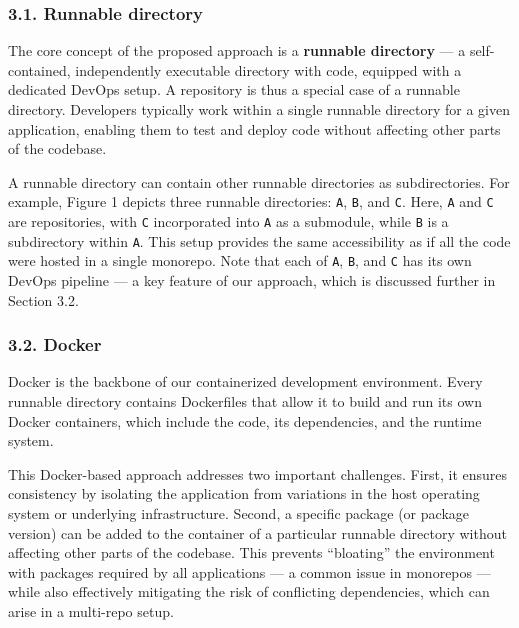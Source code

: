 \documentclass{article}
\begin{document}
\subsubsection{3.1. Runnable directory}
\label{runnable-directory}

The core concept of the proposed approach is a \textbf{runnable directory} --- a
self-contained, independently executable directory with code, equipped with a
dedicated DevOps setup. A repository is thus a special case of a runnable directory.
Developers typically work within a single runnable directory for a given
application, enabling them to test and deploy code without affecting other parts
of the codebase.

A runnable directory can contain other runnable directories as subdirectories.
For example, Figure 1 depicts three runnable directories: \texttt{A}, \texttt{B},
and \texttt{C}. Here, \texttt{A} and \texttt{C} are repositories, with \texttt{C}
incorporated into \texttt{A} as a submodule, while \texttt{B} is a subdirectory
within \texttt{A}. This setup provides the same accessibility as if all the code
were hosted in a single monorepo. Note that each of \texttt{A}, \texttt{B}, and \texttt{C}
has its own DevOps pipeline --- a key feature of our approach, which is discussed
further in Section 3.2.

%
%

\subsubsection{3.2. Docker}
\label{docker}

Docker is the backbone of our containerized development environment. Every
runnable directory contains Dockerfiles that allow it to build and run its own
Docker containers, which include the code, its dependencies, and the runtime system.

This Docker-based approach addresses two important challenges. First, it ensures
consistency by isolating the application from variations in the host operating system
or underlying infrastructure. Second, a specific package (or package version) can
be added to the container of a particular runnable directory without affecting other
parts of the codebase. This prevents ``bloating'' the environment with packages
required by all applications --- a common issue in monorepos --- while also
effectively mitigating the risk of conflicting dependencies, which can arise in a
multi-repo setup.
\end{document}
